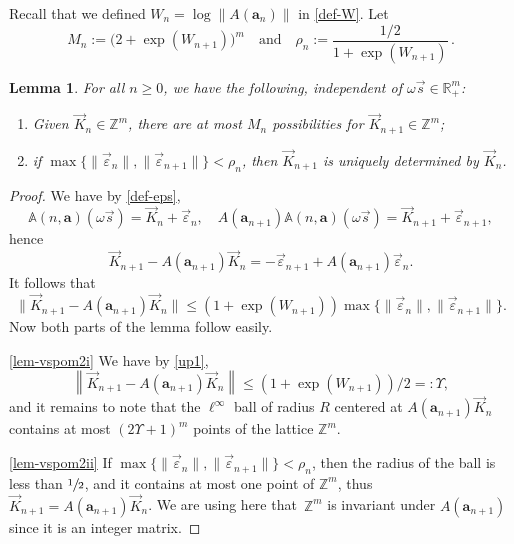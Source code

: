 \documentclass[JEP,XML,SOM,Unicode]{cedram}
\newenvironment{enumeratei}
{\bgroup\def\theenumi{\roman{enumi}}\def\theenumii{\arabic{enumii}}\begin{enumerate}}
{\end{enumerate}\egroup}
\newcommand\shalf{\sfrac{1}{2}}
\theoremstyle{plain}
\newtheorem{lemma}[theorem]{Lemma}
\theoremstyle{definition}
\newcommand\bom{{\boldsymbol a}}\let\ba\bom
\let\eps\varepsilon
\let\om\omega
\newcommand\Aa{\mathbb{A}}
\newcommand{\R}{\mathbb{R}}
\newcommand{\Z}{\mathbb{Z}}
\newcommand\be{\begin{equation}}
\newcommand\ee{\end{equation}}
\begin{document}
Recall that we defined $W_n = \log\|A(\bom_n)\|$ in \eqref{def-W}.
Let
\be \label{def-Mn}
M_n:= \bigl(2+\exp(W_{n+1})\bigr)^m\quad \text{and}\quad \rho_n:= \frac{1/2}{1+\exp(W_{n+1})}\,.
\ee

\begin{lemma} \label{lem-vspom2}
For all $n\ge 0$, we have the following, independent of $\om\vec s\in \R_+^m$:
\begin{enumeratei}
\item\label{lem-vspom2i}
Given $\vec{K}_{n}\in\Z^m$, there are at most $M_n$ possibilities for $\vec K_{n+1}\in\Z^m$;

\item\label{lem-vspom2ii}
if $\max\{\|\vec\eps_{n}\|,\|\vec\eps_{{n+1}}\| \}< \rho_n$, then $\vec K_{{n+1}}$ is uniquely determined by $\vec K_{n}$.
\end{enumeratei}
\end{lemma}

\begin{proof}
We have by \eqref{def-eps},
\[
\Aa(n,\bom) (\om\vec s) = \vec{K}_n + \vec{\eps}_n,\quad A(\bom_{n+1}) \Aa(n,\bom) (\om\vec s) = \vec{K}_{n+1} + \vec{\eps}_{n+1},
\]
hence
\[
\vec{K}_{n+1} - A(\bom_{n+1})\vec{K}_n = -\vec{\eps}_{n+1} + A(\bom_{n+1})\vec{\eps}_n.
\]
It follows that
\[
\bigl\|\vec{K}_{n+1} - A(\bom_{n+1})\vec{K}_n\bigr\| \le (1 + \exp (W_{n+1}))\max\{\|\vec\eps_{n}\|,\|\vec\eps_{{n+1}}\|\}.
\]
Now both parts of the lemma follow easily.

\eqref{lem-vspom2i} We have by \eqref{up1},
\[
\left\|\vec{K}_{n+1} - A(\bom_{n+1})\vec{K}_n\right\| \le (1 + \exp (W_{n+1}))/2=:\Upsilon,
\]
and it remains to note that the $\ell^\infty$ ball of radius $R$ centered at $A(\bom_{n+1})\vec{K}_n$ contains at most $(2\Upsilon+1)^m$ points of the lattice $\Z^m$.

\eqref{lem-vspom2ii} If $\max\{\|\vec\eps_{n}\|,\|\vec\eps_{{n+1}}\|\}< \rho_n$, then the radius of the ball is less than $\shalf$, and it contains at most one point of $\Z^m$, thus $\vec{K}_{n+1} = A(\bom_{n+1})\vec{K}_n$. We are using here that~$\Z^m$ is invariant under $A(\bom_{n+1})$ since it is an integer matrix.
\end{proof}
\end{document}
